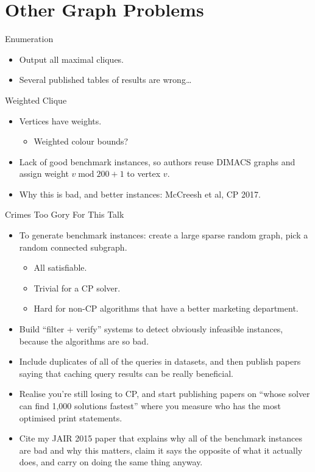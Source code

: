 \documentclass[aspectratio=169,compress,10pt]{beamer}
\begin{document}
\section{Other Graph Problems}

\begin{frame}{Enumeration}
    \begin{itemize}
        \item Output all maximal cliques.
        \item Several published tables of results are wrong\ldots
    \end{itemize}
\end{frame}

\begin{frame}{Weighted Clique}
    \begin{itemize}
        \item Vertices have weights.
            \begin{itemize}
                \item Weighted colour bounds?
            \end{itemize}
        \item Lack of good benchmark instances, so authors reuse DIMACS graphs and assign weight $v
            \operatorname{mod} 200 + 1$ to vertex $v$.
        \item Why this is bad, and better instances: McCreesh et al, CP 2017.
    \end{itemize}
\end{frame}

\begin{frame}{Crimes Too Gory For This Talk}
    \begin{itemize}
        \item To generate benchmark instances: create a large sparse random graph, pick a random
            connected subgraph.
            \begin{itemize}
                \item All satisfiable.
                \item Trivial for a CP solver.
                \item Hard for non-CP algorithms that have a better marketing department.
            \end{itemize}
        \item Build ``filter + verify'' systems to detect obviously infeasible instances, because
            the algorithms are so bad.
        \item Include duplicates of all of the queries in datasets, and then publish papers saying
            that caching query results can be really beneficial.
        \item Realise you're still losing to CP, and start publishing papers on ``whose solver can
            find 1,000 solutions fastest'' where you measure who has the most optimised print
            statements.
        \item Cite my JAIR 2015 paper that explains why all of the benchmark instances are bad and
            why this matters, claim it says the opposite of what it actually does, and carry on
            doing the same thing anyway.
    \end{itemize}
\end{frame}
\end{document}
